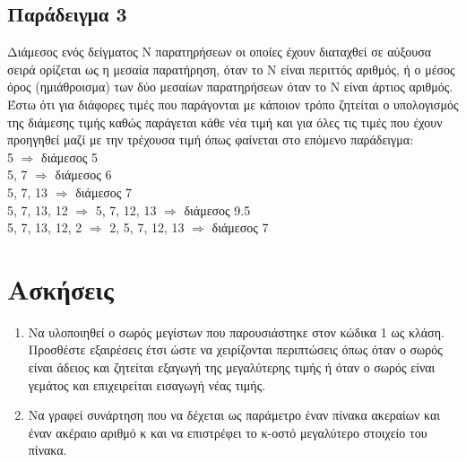 




\subsection{Παράδειγμα 3}
Διάμεσος ενός δείγματος Ν παρατηρήσεων οι οποίες έχουν διαταχθεί σε αύξουσα σειρά ορίζεται ως η μεσαία παρατήρηση, όταν το Ν είναι περιττός αριθμός, ή ο μέσος όρος (ημιάθροισμα) των δύο μεσαίων παρατηρήσεων όταν το Ν είναι άρτιος αριθμός. 
Έστω ότι για διάφορες τιμές που παράγονται με κάποιον τρόπο ζητείται ο υπολογισμός της διάμεσης  τιμής καθώς παράγεται κάθε νέα τιμή και για όλες τις τιμές που έχουν προηγηθεί μαζί με την τρέχουσα τιμή όπως φαίνεται στο επόμενο παράδειγμα:\\ 
5  $\Rightarrow$  διάμεσος 5\\
5, 7 $\Rightarrow$ διάμεσος 6\\
5, 7, 13 $\Rightarrow$ διάμεσος 7\\
5, 7, 13, 12 $\Rightarrow$ 5, 7, 12, 13 $\Rightarrow$ διάμεσος 9.5\\
5, 7, 13, 12, 2 $\Rightarrow$ 2, 5, 7, 12, 13 $\Rightarrow$ διάμεσος 7






\section{Ασκήσεις}
\begin{enumerate}
\item Να υλοποιηθεί ο σωρός μεγίστων που παρουσιάστηκε στον κώδικα 1 ως κλάση. Προσθέστε εξαιρέσεις έτσι ώστε να χειρίζονται περιπτώσεις όπως όταν ο σωρός είναι άδειος και ζητείται εξαγωγή της μεγαλύτερης τιμής ή όταν ο σωρός είναι γεμάτος και επιχειρείται εισαγωγή νέας τιμής.
\item Να γραφεί συνάρτηση που να δέχεται ως παράμετρο έναν πίνακα ακεραίων και έναν ακέραιο αριθμό κ και να επιστρέφει το κ-οστό μεγαλύτερο στοιχείο του πίνακα. 
\end{enumerate}

